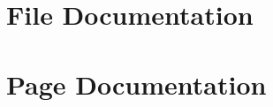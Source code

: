 \documentclass[a4paper]{book}
\begin{document}
\chapter{File Documentation}









\chapter{Page Documentation}

\printindex
\end{document}
